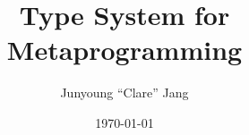 \documentclass[25pt,a0paper,portrait,innermargin=0.4in,colspace=0.4in,blockverticalspace=0.4in]{tikzposter}
\begin{document}
\title{Type System for Metaprogramming}
\author{Junyoung ``Clare'' Jang}
\date{\today}
\maketitle{}
\end{document}
